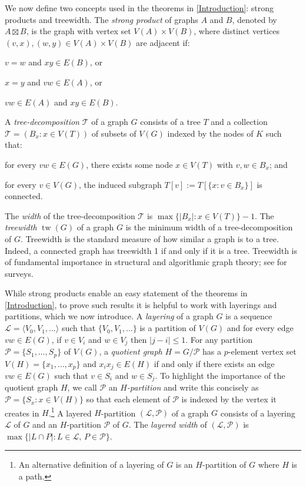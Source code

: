 \documentclass{patmorin}
\DeclareMathOperator{\tw}{tw}
\renewcommand{\leq}{\leqslant}
\begin{document}
We now define two concepts used in the theorems in \cref{Introduction}: strong products and treewidth. The \emph{strong product} of graphs $A$ and $B$, denoted by $A\boxtimes B$, is the graph with vertex set $V(A)\times V(B)$, where distinct vertices $(v,x),(w,y)\in V(A)\times V(B)$ are adjacent if: 
\begin{compactitem}
\item  $v=w$ and $xy\in E(B)$, or 
\item  $x=y$ and $vw\in E(A)$, or  
\item  $vw\in E(A)$ and $xy\in E(B)$. 
\end{compactitem}
A \emph{tree-decomposition} $\mathcal{T}$ of a graph $G$ consists of a tree $T$ and a collection $\mathcal{T}=(B_x:x\in V(T))$ of subsets of $V(G)$ indexed by the nodes of $K$ such that:
\begin{compactenum}[(i)]
\item for every $vw\in E(G)$, there exists some node $x\in V(T)$ with $v,w\in B_x$; and 
\item for every $v\in V(G)$, the induced subgraph $T[v] := T[\{x: v\in B_x\}]$ is connected.  
\end{compactenum}
The \emph{width} of the tree-decomposition $\mathcal{T}$ is $\max\{|B_x|:x\in V(T)\}-1$.  The \emph{treewidth} $\tw(G)$ of a graph $G$ is the minimum width of a tree-decomposition of $G$.  Treewidth is the standard measure of how similar a graph is to a tree. Indeed, a connected graph has treewidth 1 if and only if it is a tree. Treewidth is of fundamental importance in structural and algorithmic graph theory; see \citep{Reed03,HW17,Bodlaender-TCS98} for surveys. 

While strong products enable an easy statement of the theorems in \cref{Introduction}, to prove such results it is helpful to work with layerings and partitions, which we now introduce. A \emph{layering} of a graph $G$ is a sequence $\mathcal{L}=\langle V_0,V_1,\ldots\rangle$ such that $\{V_0,V_1,\ldots\}$ is a partition of $V(G)$ and for every edge $vw\in E(G)$, if $v\in V_i$ and $w\in V_j$ then $|j-i|\leq 1$.  For any partition $\mathcal{P}=\{S_1,\ldots,S_p\}$ of $V(G)$, a \emph{quotient graph} $H=G/\mathcal{P}$ has a $p$-element vertex set $V(H)=\{x_1,\ldots,x_p\}$ and $x_ix_j\in E(H)$ if and only if there exists an edge $vw\in E(G)$ such that $v\in S_i$ and $w\in S_j$. To highlight the importance of the quotient graph $H$, we call $\mathcal{P}$ an \emph{$H$-partition} and write this concisely as $\mathcal{P}=\{S_x : x\in V(H)\}$ so that each element of $\mathcal{P}$ is indexed by the vertex it creates in $H$.\footnote{An alternative definition of a layering of $G$ is an $H$-partition of $G$ where $H$ is a path.}  A layered $H$-partition $(\mathcal{L},\mathcal{P})$ of a graph $G$ consists of a layering $\mathcal{L}$ of $G$ and an $H$-partition $\mathcal{P}$ of $G$. The \emph{layered width} of $(\mathcal{L},\mathcal{P})$ is $\max\{|L\cap P|: L\in\mathcal{L},\, P\in\mathcal{P}\}$. 
\end{document}
